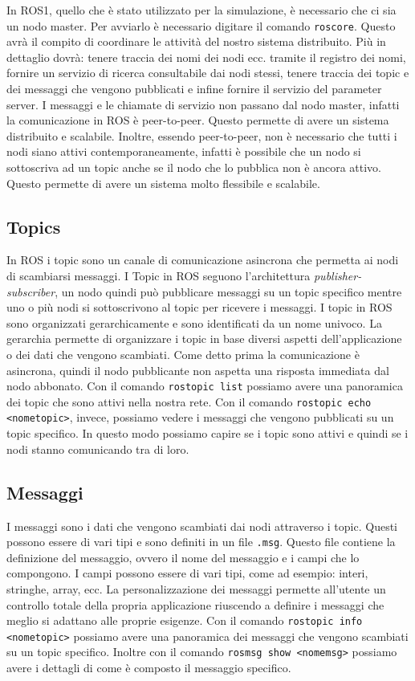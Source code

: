 In ROS1, quello che è stato utilizzato per la simulazione, è necessario che ci sia un nodo master. Per avviarlo è necessario digitare il comando \verb+roscore+. Questo avrà il compito di coordinare le attività del nostro sistema distribuito. Più in dettaglio dovrà: tenere traccia dei nomi dei nodi ecc. tramite il registro dei nomi, fornire un servizio di ricerca consultabile dai nodi stessi, tenere traccia dei topic e dei messaggi che vengono pubblicati e infine fornire il servizio del parameter server.
I messaggi e le chiamate di servizio non passano dal nodo master, infatti la comunicazione in ROS è peer-to-peer. Questo permette di avere un sistema distribuito e scalabile. Inoltre, essendo peer-to-peer, non è necessario che tutti i nodi siano attivi contemporaneamente, infatti è possibile che un nodo si sottoscriva ad un topic anche se il nodo che lo pubblica non è ancora attivo. Questo permette di avere un sistema molto flessibile e scalabile.

\subsection{Topics}
\label{subsec:topics}
In ROS i topic sono un canale di comunicazione asincrona che permetta ai nodi di scambiarsi messaggi. I Topic in ROS seguono l'architettura \textit{publisher-subscriber}, un nodo quindi può pubblicare messaggi su un topic specifico mentre uno o più nodi si sottoscrivono al topic per ricevere i messaggi.
I topic in ROS sono organizzati gerarchicamente e sono identificati da un nome univoco. La gerarchia permette di organizzare i topic in base diversi aspetti dell'applicazione o dei dati che vengono scambiati. 
Come detto prima la comunicazione è asincrona, quindi il nodo pubblicante non aspetta una risposta immediata dal nodo abbonato.
Con il comando \verb+rostopic list+ possiamo avere una panoramica dei topic che sono attivi nella nostra rete. Con il comando \verb+rostopic echo <nometopic>+, invece, possiamo vedere i messaggi che vengono pubblicati su un topic specifico. In questo modo possiamo capire se i topic sono attivi e quindi se i nodi stanno comunicando tra di loro.
\subsection{Messaggi}
\label{subsec:messaggi}
I messaggi sono i dati che vengono scambiati dai nodi attraverso i topic. Questi possono essere di vari tipi e sono definiti in un file \verb+.msg+. Questo file contiene la definizione del messaggio, ovvero il nome del messaggio e i campi che lo compongono. I campi possono essere di vari tipi, come ad esempio: interi, stringhe, array, ecc.
La personalizzazione dei messaggi permette all'utente un controllo totale della propria applicazione riuscendo a definire i messaggi che meglio si adattano alle proprie esigenze.
Con il comando \verb+rostopic info <nometopic>+ possiamo avere una panoramica dei messaggi che vengono scambiati su un topic specifico. Inoltre con il comando \verb+rosmsg show <nomemsg>+ possiamo avere i dettagli di come è composto il messaggio specifico.
